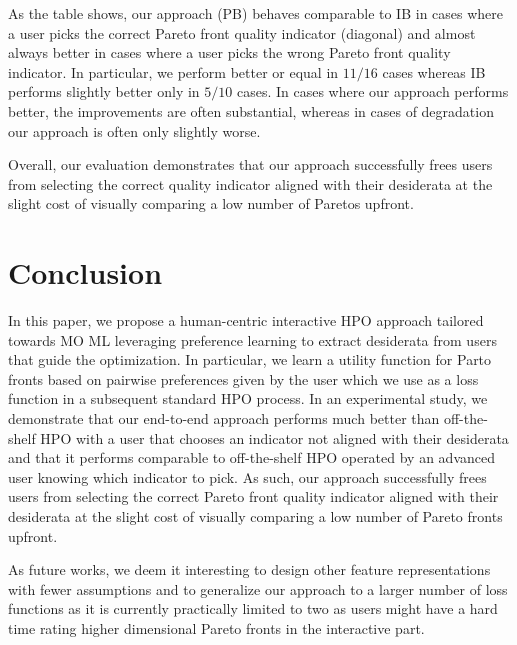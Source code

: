 As the table shows, our approach (PB) behaves comparable to IB in cases where a user picks the correct Pareto front quality indicator (diagonal) and almost always better in cases where a user picks the wrong Pareto front quality indicator. In particular, we perform better or equal in $11/16$ cases whereas IB performs slightly better only in $5/10$ cases. In cases where our approach performs better, the improvements are often substantial, whereas in cases of degradation our approach is often only slightly worse.

Overall, our evaluation demonstrates that our approach successfully frees users from selecting the correct quality indicator aligned with their desiderata at the slight cost of visually comparing a low number of Paretos upfront.

\section{Conclusion}
\label{moo-sec:conclusion}
In this paper, we propose a human-centric interactive HPO approach tailored towards MO ML leveraging preference learning to extract desiderata from users that guide the optimization. In particular, we learn a utility function for Parto fronts based on pairwise preferences given by the user which we use as a loss function in a subsequent standard HPO process. In an experimental study, we demonstrate that our end-to-end approach performs much better than off-the-shelf HPO with a user that chooses an indicator not aligned with their desiderata and that it performs comparable to off-the-shelf HPO operated by an advanced user knowing which indicator to pick. As such, our approach successfully frees users from selecting the correct Pareto front quality indicator aligned with their desiderata at the slight cost of visually comparing a low number of Pareto fronts upfront.

As future works, we deem it interesting to design other feature representations with fewer assumptions and to generalize our approach to a larger number of loss functions as it is currently practically limited to two as users might have a hard time rating higher dimensional Pareto fronts in the interactive part.
